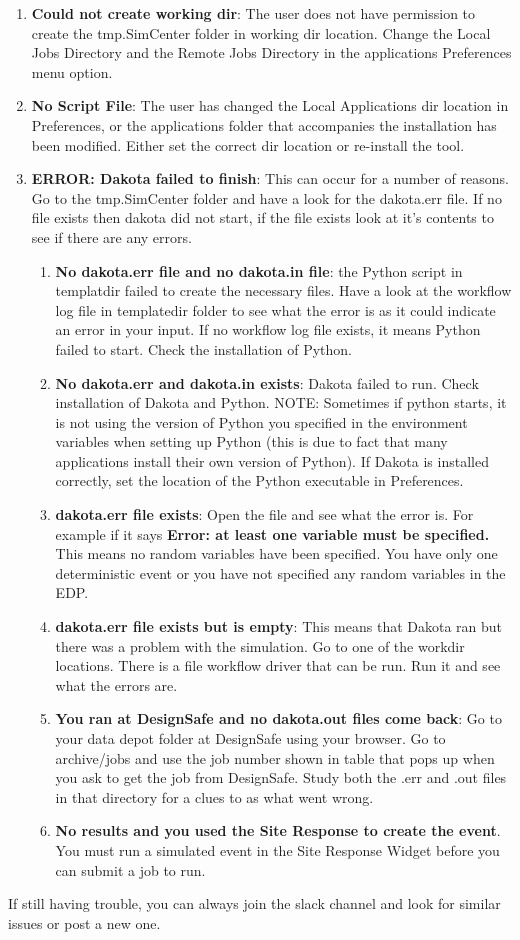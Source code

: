 \begin{enumerate}
\item \textbf{Could not create working dir}: The user does not have permission to create the tmp.SimCenter folder in working dir location. Change the Local Jobs Directory and the Remote Jobs Directory in the applications Preferences menu option. 
\item \textbf{No Script File}: The user has changed the Local Applications dir location in Preferences, or the applications folder that accompanies the installation has been modified. Either set the correct dir location or re-install the tool.
\item \textbf{ERROR: Dakota failed to finish}: This can occur for a number of reasons. Go to the tmp.SimCenter folder and have a look for the dakota.err file. If no file exists then dakota did not start, if the file exists look at it's contents to see if there are any errors.
\begin{enumerate}
\item \textbf{No dakota.err file and no dakota.in file}: the Python script in templatdir failed to create the necessary files. Have a look at the workflow log file in templatedir folder to see what the error is as it could indicate an error in your input. If no workflow log file exists, it means Python failed to start. Check the installation of Python.
\item \textbf{No dakota.err and dakota.in exists}: Dakota failed to run. Check installation of Dakota and Python. NOTE: Sometimes if python starts, it is not using the version of Python you specified in the environment variables when setting up Python (this is due to fact that many applications install their own version of Python). If Dakota is installed correctly, set the location of the Python executable in Preferences.
\item \textbf{dakota.err file exists}: Open the file and see what the error is.  For example if it says \textbf{Error: at least one variable must be specified.} This means no random variables have been specified. You have only one deterministic event or you have not specified any random variables in the EDP.
\item \textbf{dakota.err file exists but is empty}: This means that Dakota ran but there was a problem with the simulation. Go to one of the workdir locations. There is a file workflow driver that can be run. Run it and see what the errors are.
\item \textbf{You ran at DesignSafe and no dakota.out files come back}: Go to your data depot folder at DesignSafe using your browser. Go to archive/jobs and use the job number shown in table that pops up when you ask to get the job from DesignSafe. Study both the .err and .out files in that directory for a clues to as what went wrong.
\item \textbf{No results and you used the Site Response to create the event}. You must run a simulated event in the Site Response Widget before you can submit a job to run.
\end{enumerate}
\end{enumerate}

If still having trouble, you can always join the \texttt{\getsoftwarename{}} slack channel and look for similar issues or post a new one.

